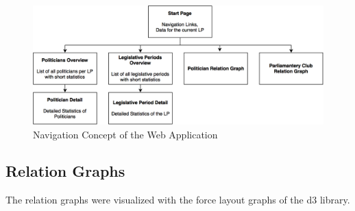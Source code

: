 \begin{figure}
	\centering
	\includegraphics[width=\textwidth]{imgs/navigation_concept}
	\caption{Navigation Concept of the Web Application}
	\label{fig:navigation_concept}
\end{figure}


\subsection{Relation Graphs}
The relation graphs were visualized with the force layout graphs of the d3 library. 

